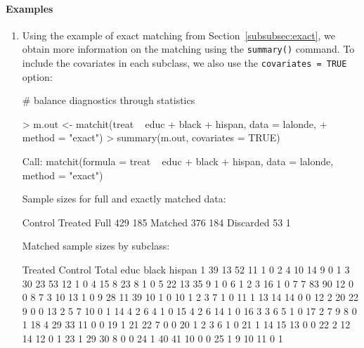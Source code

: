 \documentclass[oneside,letterpaper,titlepage]{article}
\begin{document}
\paragraph{Examples}
\begin{enumerate}
\item Using the example of exact matching from
  Section~\ref{subsubsec:exact}, we obtain more information on the
  matching using the {\tt summary()} command.  To include the
  covariates in each subclass, we also use the \texttt{covariates =
    TRUE} option:

\# balance diagnostics through statistics
\begin{Schunk}
\begin{Sinput}
> m.out <- matchit(treat ~ educ + black + hispan, data = lalonde, 
+     method = "exact")
> summary(m.out, covariates = TRUE)
\end{Sinput}
\begin{Soutput}
Call:
matchit(formula = treat ~ educ + black + hispan, data = lalonde,     method = "exact")


Sample sizes for full and exactly matched data:

          Control Treated
Full          429     185
Matched       376     184
Discarded      53       1

Matched sample sizes by subclass:

   Treated Control Total educ black hispan
1       39      13    52   11     1      0
2        4      10    14    9     0      1
3       30      23    53   12     1      0
4       15       8    23    8     1      0
5       22      13    35    9     1      0
6        1       2     3   16     1      0
7        7      83    90   12     0      0
8        7       3    10   13     1      0
9       28      11    39   10     1      0
10       1       2     3    7     1      0
11       1      13    14   14     0      0
12       2      20    22    9     0      0
13       2       5     7   10     0      1
14       4       2     6    4     1      0
15       4       2     6   14     1      0
16       3       3     6    5     1      0
17       2       7     9    8     0      1
18       4      29    33   11     0      0
19       1      21    22    7     0      0
20       1       2     3    6     1      0
21       1      14    15   13     0      0
22       2      12    14   12     0      1
23       1      29    30    8     0      0
24       1      40    41   10     0      0
25       1       9    10   11     0      1
\end{Soutput}
\end{Schunk}


\end{enumerate}
\end{document}
